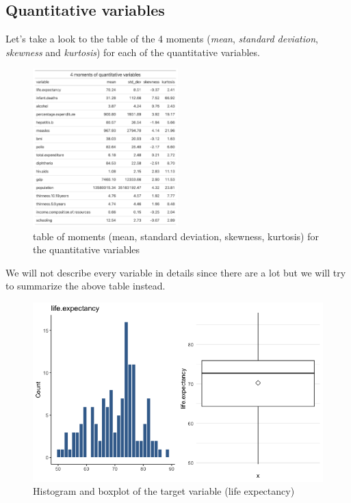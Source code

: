 \subsection{Quantitative variables}

Let's take a look to the table of the 4 moments (\textit{mean}, \textit{standard deviation}, \textit{skewness} and \textit{kurtosis}) for each of the quantitative variables. 

\begin{figure}[H]
	\centering
	\includegraphics[width=0.5\textwidth]{figures/eda/quantitative_variables_moments.png}
	\caption{table of moments (mean, standard deviation, skewness, kurtosis) for the quantitative variables}
	\label{fig:quantitative_variables_moments}
\end{figure}

We will not describe every variable in details since there are a lot but we will try to summarize the above table instead.


\begin{figure}[H]
	\centering
	\includegraphics{figures/eda/histogram_boxplot_target.png}
	\caption{Histogram and boxplot of the target variable (life expectancy)}
	\label{fig:histogram_boxplot_target}
\end{figure}

